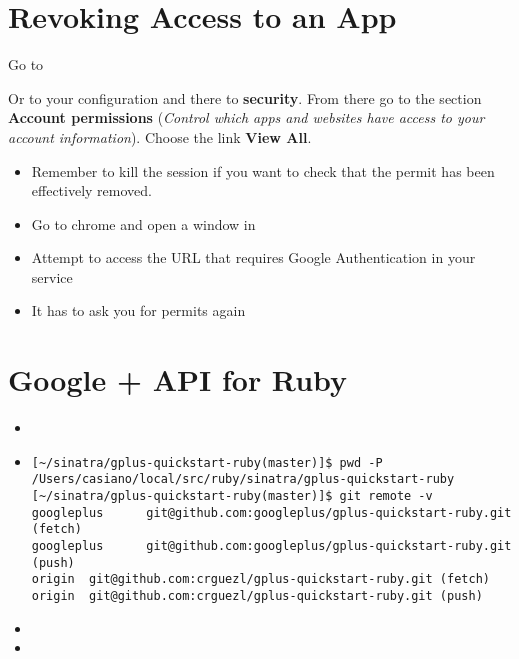 \section{Revoking Access to an App}

Go to

Or to your configuration 
and there to {\bf security}. From there go to the section
{\bf Account permissions} ({\it Control which apps and websites have access
to your account information}). Choose the link {\bf View All}.

\begin{itemize}
\item
Remember to kill the session if you want to check that the permit
has been effectively removed. 
\item
Go to chrome and open a window in 
\item
Attempt to access the URL that requires Google Authentication
in your service
\item
It has to ask you for permits again
\end{itemize}





\section{Google + API for Ruby}


\begin{itemize}
\item
{}
\item
\begin{verbatim}
[~/sinatra/gplus-quickstart-ruby(master)]$ pwd -P
/Users/casiano/local/src/ruby/sinatra/gplus-quickstart-ruby
[~/sinatra/gplus-quickstart-ruby(master)]$ git remote -v
googleplus      git@github.com:googleplus/gplus-quickstart-ruby.git (fetch)
googleplus      git@github.com:googleplus/gplus-quickstart-ruby.git (push)
origin  git@github.com:crguezl/gplus-quickstart-ruby.git (fetch)
origin  git@github.com:crguezl/gplus-quickstart-ruby.git (push)
\end{verbatim}
\item
{}
\item
{}
\end{itemize}

